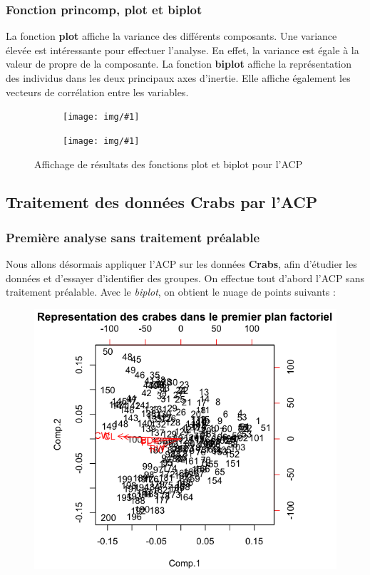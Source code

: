 \documentclass[a4paper,11pt]{article}
\newcommand{\InsertFig}[1]{
\begin{figure}[H]
\begin{center}
\texttt{[image: img/\#1]}
\end{center}
\end{figure}}
\begin{document}
\subsubsection{Fonction princomp, plot et biplot}

\noindent La fonction \textbf{plot} affiche la variance des différents composants. Une variance élevée est intéressante pour effectuer l'analyse. En effet, la variance est égale à la valeur de propre de la composante.
\noindent La fonction \textbf{biplot} affiche la représentation des individus dans les deux principaux axes d'inertie. Elle affiche également les vecteurs de corrélation entre les variables.

\begin{figure}[H]

  \begin{minipage}[b]{0.45\linewidth}
   \centering
   \InsertFig{plotacp} 
  \end{minipage}
\hfill
  \begin{minipage}[b]{0.45\linewidth}
   \centering
  \InsertFig{biplotacp}     
  \end{minipage}

  \caption{Affichage de résultats des fonctions plot et biplot pour l'ACP}
  \label{fig:ma_fig}
  
  \end{figure}
  
\subsection{Traitement des données Crabs par l'ACP}

\subsubsection{Première analyse sans traitement préalable}

\noindent Nous allons désormais appliquer l'ACP sur les données \textbf{Crabs}, afin d'étudier les données et d'essayer d'identifier des groupes.
\noindent On effectue tout d'abord l'ACP sans traitement préalable. Avec le \textit{biplot}, on obtient le nuage de points suivants : 

\begin{figure}[H]
\begin{center}
\includegraphics[width=.6\textwidth]{img/acpcrabs.png}
\end{center}
\end{figure}
\end{document}
